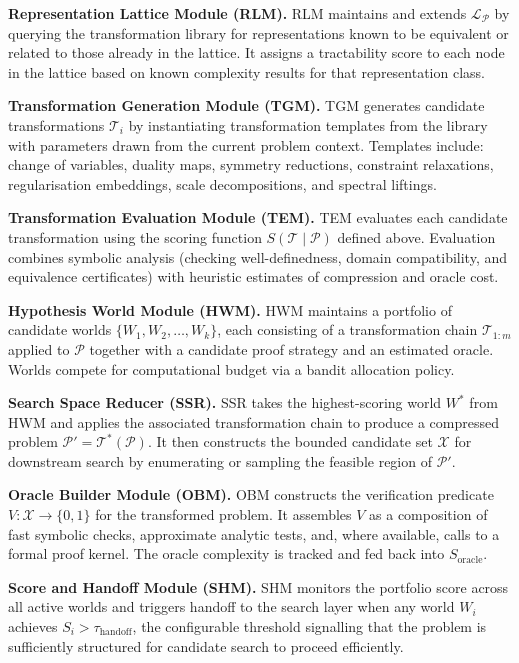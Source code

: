 \textbf{Representation Lattice Module (RLM).} RLM maintains and extends $\mathcal{L}_{\mathcal{P}}$ by querying the transformation library for representations known to be equivalent or related to those already in the lattice. It assigns a tractability score to each node in the lattice based on known complexity results for that representation class.

\textbf{Transformation Generation Module (TGM).} TGM generates candidate transformations $\mathcal{T}_i$ by instantiating transformation templates from the library with parameters drawn from the current problem context. Templates include: change of variables, duality maps, symmetry reductions, constraint relaxations, regularisation embeddings, scale decompositions, and spectral liftings.

\textbf{Transformation Evaluation Module (TEM).} TEM evaluates each candidate transformation using the scoring function $S(\mathcal{T} \mid \mathcal{P})$ defined above. Evaluation combines symbolic analysis (checking well-definedness, domain compatibility, and equivalence certificates) with heuristic estimates of compression and oracle cost.

\textbf{Hypothesis World Module (HWM).} HWM maintains a portfolio of candidate worlds $\{W_1, W_2, \ldots, W_k\}$, each consisting of a transformation chain $\mathcal{T}_{1:m}$ applied to $\mathcal{P}$ together with a candidate proof strategy and an estimated oracle. Worlds compete for computational budget via a bandit allocation policy.

\textbf{Search Space Reducer (SSR).} SSR takes the highest-scoring world $W^*$ from HWM and applies the associated transformation chain to produce a compressed problem $\mathcal{P}' = \mathcal{T}^*(\mathcal{P})$. It then constructs the bounded candidate set $\mathcal{X}$ for downstream search by enumerating or sampling the feasible region of $\mathcal{P}'$.

\textbf{Oracle Builder Module (OBM).} OBM constructs the verification predicate $V : \mathcal{X} \rightarrow \{0,1\}$ for the transformed problem. It assembles $V$ as a composition of fast symbolic checks, approximate analytic tests, and, where available, calls to a formal proof kernel. The oracle complexity is tracked and fed back into $S_{\text{oracle}}$.

\textbf{Score and Handoff Module (SHM).} SHM monitors the portfolio score across all active worlds and triggers handoff to the search layer when any world $W_i$ achieves $S_i > \tau_{\text{handoff}}$, the configurable threshold signalling that the problem is sufficiently structured for candidate search to proceed efficiently.

